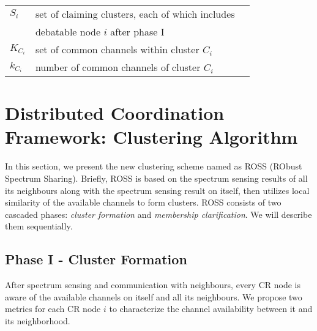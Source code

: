\begin{table}[h!]
\begin{tabular}{llr}
$S_i$ & set of claiming clusters, each of which includes \\
& debatable node $i$ after phase I\\
$K_{C_i}$ & set of common channels within cluster $C_i$\\
$k_{C_i}$ & number of common channels of cluster $C_i$\\
\bottomrule
\end{tabular}
\end{table}





\section{Distributed Coordination Framework: Clustering Algorithm}
\label{ross}



In this section, we present the new clustering scheme named as \gls{ROSS} (RObust Spectrum Sharing).
Briefly, ROSS is based on the spectrum sensing results of all its neighbours along with the spectrum sensing result on itself, then utilizes local similarity of the available channels to form clusters.
ROSS consists of two cascaded phases: \textit{cluster formation} and \textit{membership clarification}.
We will describe them sequentially.

\subsection{Phase I - Cluster Formation}
\label{phaseI}
After spectrum sensing and communication with neighbours, every CR node is aware of the available channels on itself and all its neighbours.
We propose two metrics for each CR node $i$ to characterize the channel availability between it and its neighborhood.

